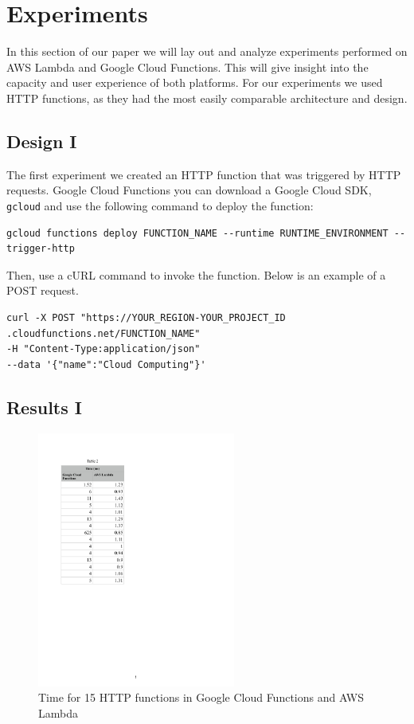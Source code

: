 \documentclass[10pt, conference]{IEEEtran}
\begin{document}
\section{ Experiments}
In this section of our paper we will lay out and analyze experiments performed on AWS Lambda and Google Cloud Functions. This will give insight into the capacity and user experience of both platforms. For our experiments we used HTTP functions, as they had the most easily comparable architecture and design. 

\subsection{Design I}
The first experiment we created an HTTP function that was triggered by HTTP requests. Google Cloud Functions you can download a Google Cloud SDK, \verb|gcloud| and use the following command to deploy the function: 

\begin{lstlisting}
gcloud functions deploy FUNCTION_NAME --runtime RUNTIME_ENVIRONMENT --trigger-http
\end{lstlisting}

Then, use a cURL command to invoke the function. Below is an example of a POST request. 
\begin{lstlisting}
curl -X POST "https://YOUR_REGION-YOUR_PROJECT_ID
.cloudfunctions.net/FUNCTION_NAME" 
-H "Content-Type:application/json" 
--data '{"name":"Cloud Computing"}'
\end{lstlisting}


\subsection{Results I}

\begin{figure}[!htbp]
\centerline{\includegraphics[width=6.5cm]{table2.PDF}}
\caption{Time for 15 HTTP functions in Google Cloud Functions and AWS Lambda}
\label{fig:tabletwo}
\end{figure}
\end{document}
